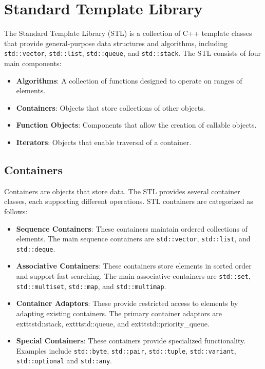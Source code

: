 \chapter{Standard Template Library}\label{ch:stl}

The Standard Template Library (STL) is a collection of C++ template classes that provide general-purpose data structures and algorithms, including \texttt{std::vector}, \texttt{std::list}, \texttt{std::queue}, and \texttt{std::stack}. The STL consists of four main components:

\begin{itemize}
    \item \textbf{Algorithms}: A collection of functions designed to operate on ranges of elements.
    \item \textbf{Containers}: Objects that store collections of other objects.
    \item \textbf{Function Objects}: Components that allow the creation of callable objects.
    \item \textbf{Iterators}: Objects that enable traversal of a container.
\end{itemize}

\section{Containers}

Containers are objects that store data. The STL provides several container classes, each supporting different operations. STL containers are categorized as follows:

\begin{itemize}
    \item \textbf{Sequence Containers}: These containers maintain ordered collections of elements. The main sequence containers are \texttt{std::vector}, \texttt{std::list}, and \texttt{std::deque}.
    \item \textbf{Associative Containers}: These containers store elements in sorted order and support fast searching. The main associative containers are \texttt{std::set}, \texttt{std::multiset}, \texttt{std::map}, and \texttt{std::multimap}.
    \item \textbf{Container Adaptors}: These provide restricted access to elements by adapting existing containers. The primary container adaptors are 	exttt{std::stack}, 	exttt{std::queue}, and 	exttt{std::priority\_queue}.
    \item \textbf{Special Containers}: These containers provide specialized functionality. Examples include \texttt{std::byte}, \texttt{std::pair}, \texttt{std::tuple}, \texttt{std::variant}, \texttt{std::optional} and \texttt{std::any}.
\end{itemize}

